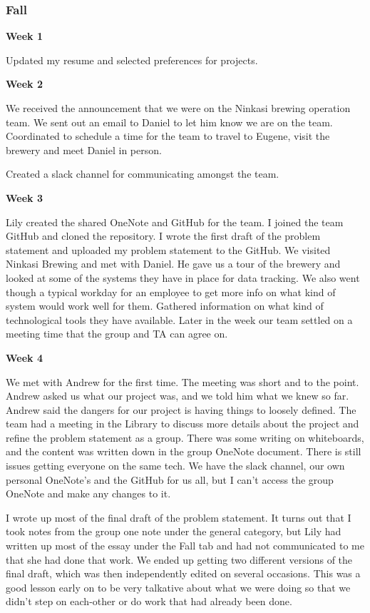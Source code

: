 \subsubsection{Fall}
\hfill\break
\noindent\medskip\textbf{Week 1}

Updated my resume and selected preferences for projects.

\noindent\medskip\textbf{Week 2}

We received the announcement that we were on the Ninkasi brewing operation team.
We sent out an email to Daniel to let him know we are on the team.
Coordinated to schedule a time for the team to travel to Eugene, visit the brewery and meet Daniel in person.

Created a slack channel for communicating amongst the team.

\noindent\medskip\textbf{Week 3}

Lily created the shared OneNote and GitHub for the team.
I joined the team GitHub and cloned the repository.
I wrote the first draft of the problem statement and uploaded my problem statement to the GitHub.
We visited Ninkasi Brewing and met with Daniel.
He gave us a tour of the brewery and looked at some of the systems they have in place for data tracking.
We also went though a typical workday for an employee to get more info on what kind of system would work well for them.
Gathered information on what kind of technological tools they have available.
Later in the week our team settled on a meeting time that the group and TA can agree on.

\noindent\medskip\textbf{Week 4}

We met with Andrew for the first time.
The meeting was short and to the point.
Andrew asked us what our project was, and we told him what we knew so far.
Andrew said the dangers for our project is having things to loosely defined.
The team had a meeting in the Library to discuss more details about the project and refine the problem statement as a group.
There was some writing on whiteboards, and the content was written down in the group OneNote document.
There is still issues getting everyone on the same tech.
We have the slack channel, our own personal OneNote's and the GitHub for us all, but I can't access the group OneNote and make any changes to it.

I wrote up most of the final draft of the problem statement.
It turns out that I took notes from the group one note under the general category, but Lily had written up most of the essay under the Fall tab and had not communicated to me that she had done that work.
We ended up getting two different versions of the final draft, which was then independently edited on several occasions.
This was a good lesson early on to be very talkative about what we were doing so that we didn't step on each-other or do work that had already been done.

